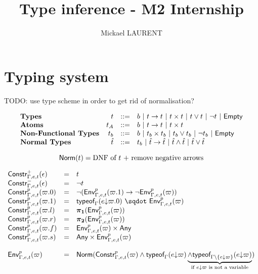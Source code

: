 \documentclass[a4paper]{article}
\title{\vspace{1.5cm}Type inference - M2 Internship}
\author{Mickael LAURENT}
\date{\vspace{-5ex}}
\theoremstyle{definition}
\begin{document}
    \maketitle

    \section{Typing system}

    TODO: use type scheme in order to get rid of normalisation?

    \[
      \begin{array}{lrcl}
      \textbf{Types} & t & ::= & b~|~ t\to t~|~ t\times t~|~ t\vee t ~|~ \neg t ~|~ \textsf{Empty}\\
      \textbf{Atoms} & t_A & ::= & b~|~ t\to t~|~ t\times t\\
      \textbf{Non-Functional Types} & t_b & ::= & b ~|~ t_b\times t_b ~|~ t_b\vee t_b ~|~ \neg t_b ~|~ \textsf{Empty}\\
      \textbf{Normal Types} & \hat t & ::= & t_b ~|~ \hat t\to \hat t~|~ \hat t \wedge \hat t ~|~ \hat t\vee \hat t
      \end{array}
    \]

    \[
      \textsf{Norm}(t) = \text{DNF of } t \text{ + remove negative arrows}
    \]

    \[
    \begin{array}{lcl}
      \typep+\epsilon{\Gamma,e,t} & = & t\\
      \typep-\epsilon{\Gamma,e,t} & = & \neg t\\
      \typep{p}{\varpi.0}{\Gamma,e,t} & = & \neg(\arrow{\Gp p{\Gamma,e,t}{(\varpi.1)}}{\neg \Gp p {\Gamma,e,t} (\varpi)})\\
      \typep{p}{\varpi.1}{\Gamma,e,t} & = & \worra{\tyof{\occ e{\varpi.0}}\Gamma}{\Gp p {\Gamma,e,t} (\varpi)}\\
      \typep{p}{\varpi.l}{\Gamma,e,t} & = & \bpl{\Gp p {\Gamma,e,t} (\varpi)}\\
      \typep{p}{\varpi.r}{\Gamma,e,t} & = & \bpr{\Gp p {\Gamma,e,t} (\varpi)}\\
      \typep{p}{\varpi.f}{\Gamma,e,t} & = & \pair{\Gp p {\Gamma,e,t} (\varpi)}\Any\\
      \typep{p}{\varpi.s}{\Gamma,e,t} & = & \pair\Any{\Gp p {\Gamma,e,t} (\varpi)}\\ \\
      \Gp p {\Gamma,e,t} (\varpi) & = & \norm {\typep p \varpi {\Gamma,e,t} \land \tyof {\occ e \varpi} \Gamma
    \underbrace{\land \tyof {\occ e \varpi} {\Gamma\setminus\{\occ e \varpi\}}}_{\text{if $\occ e \varpi$ is not a variable}}}\\
    \end{array}
    \]
\end{document}
